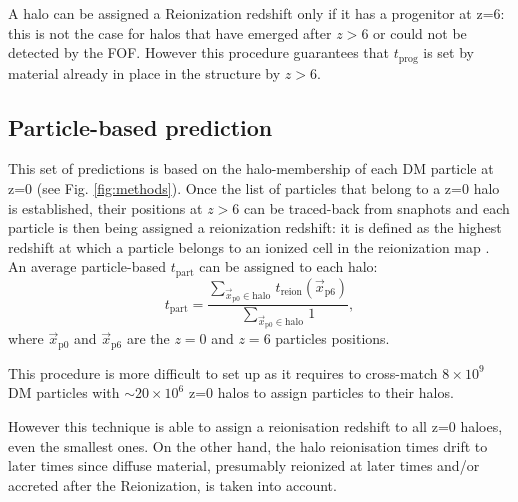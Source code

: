 \documentclass[twocolumn]{aastex61}
\begin{document}
A halo can be assigned a Reionization redshift only if it has a progenitor at z=6: this is not the case for halos that have emerged after $z>6$ or could not be detected by the FOF. %
However this procedure guarantees that $t_\mathrm{prog}$ is set by material already in place in the structure by $z>6$.

\subsection{Particle-based prediction}
This set of predictions is based on the halo-membership of each DM particle at z=0 (see Fig. \ref{fig:methods}). Once the list of particles that belong to a z=0 halo is established, their positions at $z>6$ can be traced-back from snaphots and each particle is then being assigned a reionization redshift: it is defined as the highest redshift at which a particle belongs to an ionized cell in the reionization map . An average particle-based $t_\mathrm{part}$  can be assigned to each halo:
\begin{equation}
t_\mathrm{part}=\frac{\sum_{\vec x_\mathrm{p0} \in \mathrm{halo} \ } t_\mathrm{reion}(\vec x_\mathrm{p6})}{\sum_{\vec x_\mathrm{p0} \in \mathrm{halo} \ } 1},
\end{equation}
where $\vec x_\mathrm{p0}$ and $\vec x_\mathrm{p6}$ are the $z=0$ and $z=6$ particles positions.

This procedure is more difficult to set up as it requires to cross-match $8\times 10^9$ DM particles with $\sim 20\times 10^6$ z=0 halos  to assign particles to their halos. 

However this technique is able to assign a reionisation redshift to all z=0 haloes, even the smallest ones. On the other hand, the halo reionisation times drift to later times since diffuse material, presumably reionized at later times and/or  accreted after the Reionization, is taken into account. 
 
% 
\end{document}
